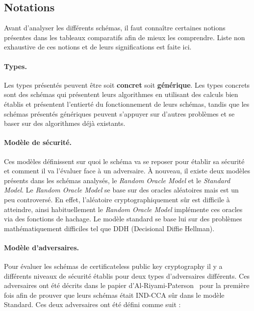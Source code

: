 \subsection{Notations}
\label{subsec:asavoir}
Avant d'analyser les différents schémas, il faut connaître certaines notions présentes dans les tableaux comparatifs afin de mieux les comprendre. Liste non exhaustive de ces notions et de leurs significations est faite ici.

\paragraph*{Types.} 
Les types présentés peuvent être soit \textbf{concret} soit \textbf{générique}. Les types concrets sont des schémas qui présentent leurs algorithmes en utilisant des calculs bien établis et présentent l'entierté du fonctionnement de leurs schémas, tandis que les schémas présentés génériques peuvent s'appuyer sur d'autres problèmes et se baser sur des algorithmes déjà existants.

\paragraph*{Modèle de sécurité.} 
Ces modèles définissent sur quoi le schéma va se reposer pour établir sa sécurité et comment il va l'évaluer face à un adversaire. À nouveau, il existe deux modèles présents dans les schémas analysés, le \textit{Random Oracle Model} et le \textit{Standard Model}. Le \textit{Random Oracle Model} se base sur des oracles aléatoires mais est un peu controversé. En effet, l'aléatoire cryptographiquement sûr est difficile à atteindre, ainsi habituellement le \textit{Random Oracle Model} implémente ces oracles via des fonctions de hachage. Le modèle standard se base lui sur des problèmes mathématiquement difficiles tel que DDH (Decisional Diffie Hellman).

\paragraph*{Modèle d'adversaires.}
Pour évaluer les schémas de certificateless public key cryptography il y a différents niveaux de sécurité établis pour deux types d'adversaires différents. Ces adversaires ont été décrits dans le papier d'Al-Riyami-Paterson~\cite{conf/asiacrypt/Al-RiyamiP03} pour la première fois afin de prouver que leurs schémas était IND-CCA sûr dans le modèle Standard. Ces deux adversaires ont été défini comme suit :


